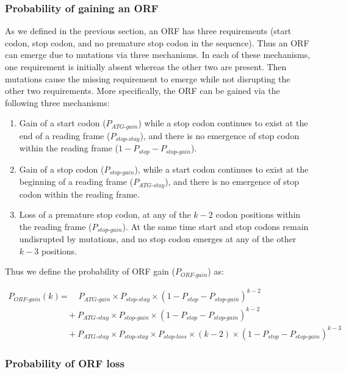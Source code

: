 \documentclass[12pt,a4paper]{article}
\begin{document}
\subsubsection{Probability of gaining an ORF}

As we defined in the previous section, an ORF has three requirements (start codon, stop codon, and no premature stop codon in the sequence). Thus an ORF can emerge due to mutations via three mechanisms. In each of these mechanisms, one requirement is initially absent whereas the other two are present. Then mutations cause the missing requirement to emerge while not disrupting the other two requirements. More specifically, the ORF can be gained via the following three mechanisms:
\begin{enumerate}
\item Gain of a start codon ($P_\textit{ATG-gain}$) while a stop codon continues to exist at the end of a reading frame ($P_\textit{stop-stay}$), and there is no emergence of stop codon within the reading frame ($1- P_\textit{stop} - P_\textit{stop-gain}$).
\item Gain of a stop codon ($P_\textit{stop-gain}$), while a start codon continues to exist at the beginning of a reading frame ($P_\textit{ATG-stay}$), and there is no emergence of stop codon within the reading frame.
\item Loss of a premature stop codon, at any of the $k-2$ codon positions within the reading frame ($P_\textit{stop-gain}$). At the same time start and stop codons remain undisrupted by mutations, and no stop codon emerges at any of the other $k-3$ positions.
\end{enumerate} 

Thus we define the probability of ORF gain ($P_\textit{ORF-gain}$) as:

\begin{align}
P_\textit{ORF-gain}(k) & = \quad P_\textit{ATG-gain}\times P_\textit{stop-stay} \times (1- P_\textit{stop} - P_\textit{stop-gain})^{k-2} \nonumber \\[1pt]
& \quad + P_\textit{ATG-stay}\times P_\textit{stop-gain} \times (1- P_\textit{stop} - P_\textit{stop-gain})^{k-2} \nonumber \\[1pt]
& \quad + P_\textit{ATG-stay}\times P_\textit{stop-stay} \times P_\textit{stop-loss}\times(k-2) \times (1- P_\textit{stop} - P_\textit{stop-gain})^{k-3} 
\label{eqorfgain}
\end{align}

\subsubsection{Probability of ORF loss}
\end{document}
